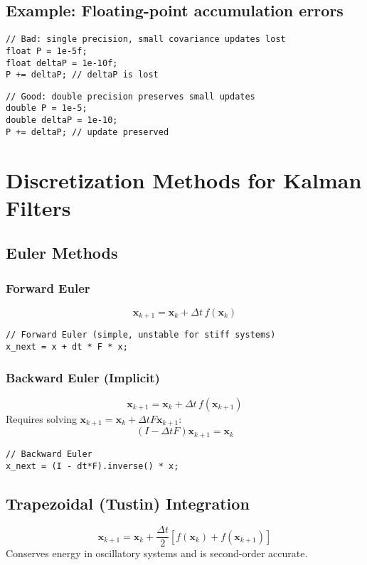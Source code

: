 \documentclass[11pt]{article}
\begin{document}
\subsection{Example: Floating-point accumulation errors}
\begin{lstlisting}
// Bad: single precision, small covariance updates lost
float P = 1e-5f;
float deltaP = 1e-10f;
P += deltaP; // deltaP is lost
\end{lstlisting}

\begin{lstlisting}
// Good: double precision preserves small updates
double P = 1e-5;
double deltaP = 1e-10;
P += deltaP; // update preserved
\end{lstlisting}

\section{Discretization Methods for Kalman Filters}

\subsection{Euler Methods}
\subsubsection{Forward Euler}
\[
\bm{x}_{k+1} = \bm{x}_k + \Delta t \, f(\bm{x}_k)
\]
\begin{lstlisting}
// Forward Euler (simple, unstable for stiff systems)
x_next = x + dt * F * x;
\end{lstlisting}

\subsubsection{Backward Euler (Implicit)}
\[
\bm{x}_{k+1} = \bm{x}_k + \Delta t \, f(\bm{x}_{k+1})
\]
Requires solving $\bm{x}_{k+1} = \bm{x}_k + \Delta t F \bm{x}_{k+1}$:
\[
(I - \Delta t F) \bm{x}_{k+1} = \bm{x}_k
\]

\begin{lstlisting}
// Backward Euler
x_next = (I - dt*F).inverse() * x;
\end{lstlisting}

\subsection{Trapezoidal (Tustin) Integration}
\[
\bm{x}_{k+1} = \bm{x}_k + \frac{\Delta t}{2} \left[f(\bm{x}_k) + f(\bm{x}_{k+1})\right]
\]
Conserves energy in oscillatory systems and is second-order accurate.
\end{document}
